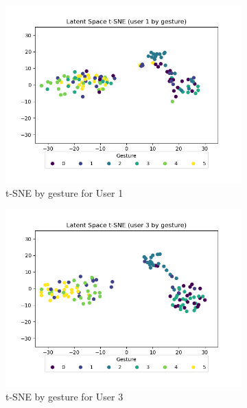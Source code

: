 \begin{figure}[b]
	\centering
	\begin{subfigure}{0.3\textwidth}
		\centering
		\includegraphics[width=\textwidth]{figures/extended/long_ls_u1}
		\caption{t-SNE by gesture for User 1}
	\end{subfigure}
	\hfill
	\begin{subfigure}{0.3\textwidth}
		\centering
		\includegraphics[width=\textwidth]{figures/extended/long_ls_u3}
		\caption{t-SNE by gesture for User 3}
	\end{subfigure}
	\hfill
	\begin{subfigure}{0.3\textwidth}
		\centering

\end{subfigure}
\end{figure}
